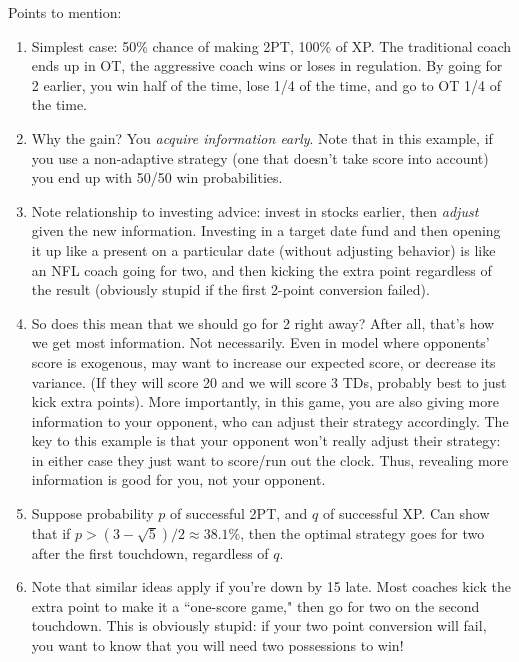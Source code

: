 \documentclass[11pt, oneside]{article}   	%
\begin{document}
{\color{blue} Points to mention:}
\begin{enumerate}
\item Simplest case: 50\% chance of making 2PT, 100\% of XP. The traditional coach ends up in OT, the aggressive coach wins or loses in regulation. By going for 2 earlier, you win half of the time, lose 1/4 of the time, and go to OT 1/4 of the time.
\item Why the gain? You {\em acquire information early}. Note that in this example, if you use a non-adaptive strategy (one that doesn't take score into account) you end up with 50/50 win probabilities.
\item Note relationship to investing advice: invest in stocks earlier, then {\em adjust} given the new information. Investing in a target date fund and then opening it up like a present on a particular date (without adjusting behavior) is like an NFL coach going for two, and then kicking the extra point regardless of the result (obviously stupid if the first 2-point conversion failed).
\item So does this mean that we should go for 2 right away? After all, that's how we get most information. Not necessarily. Even in model where opponents' score is exogenous, may want to increase our expected score, or decrease its variance. (If they will score 20 and we will score 3 TDs, probably best to just kick extra points). More importantly, in this game, you are also giving more information to your opponent, who can adjust their strategy accordingly. The key to this example is that your opponent won't really adjust their strategy: in either case they just want to score/run out the clock. Thus, revealing more information is good for you, not your opponent.
\item Suppose probability $p$ of successful 2PT, and $q$ of successful XP. Can show that if $p > (3 - \sqrt{5})/2 \approx 38.1\%$, then the optimal strategy goes for two after the first touchdown, regardless of $q$.
\item Note that similar ideas apply if you're down by 15 late. Most coaches kick the extra point to make it a ``one-score game," then go for two on the second touchdown. This is obviously stupid: if your two point conversion will fail, you want to know that you will need two possessions to win!
\end{enumerate}
\end{document}
